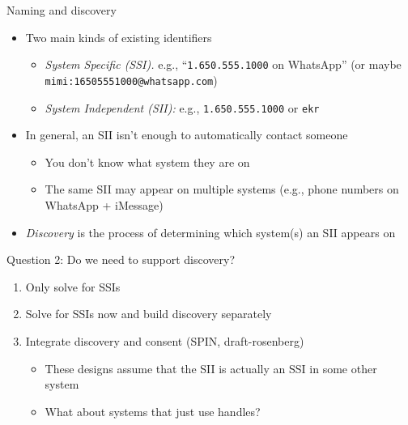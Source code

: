 \documentclass[helvetica]{beamer}
\begin{document}
\begin{frame}{Naming and discovery}

  \begin{itemize}
  \item Two main kinds of existing identifiers
    \begin{itemize}
    \item \emph{System Specific (SSI).} e.g., ``\texttt{1.650.555.1000} on WhatsApp''
      (or maybe \texttt{mimi:16505551000@whatsapp.com})
    \item \emph{System Independent (SII):} e.g., \texttt{1.650.555.1000} or \texttt{ekr}
    \end{itemize}
  \item In general, an SII isn't enough to automatically contact someone
    \begin{itemize}
    \item You don't know what system they are on
    \item The same SII may appear on multiple systems (e.g., phone numbers on WhatsApp + iMessage)
    \end{itemize}
  \item \emph{Discovery} is the process of determining which system(s) an SII appears on
  \end{itemize}
\end{frame}

\begin{frame}{Question 2: Do we need to support discovery?}
  
  \begin{enumerate}
    \item Only solve for SSIs
    \item Solve for SSIs now and build discovery separately
    \item Integrate discovery and consent (SPIN, draft-rosenberg)
      \begin{itemize}
      \item These designs assume that the SII is actually an SSI in some other system
      \item What about systems that just use handles?
      \end{itemize}
  \end{enumerate}      
\end{frame}
\end{document}
